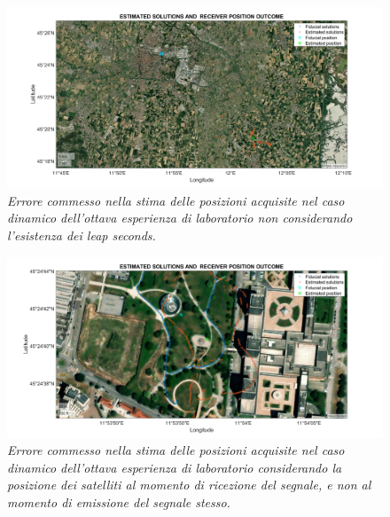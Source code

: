 \documentclass[a4paper,11pt,twoside]{book}
\begin{document}
	\begin{figure}[H]
		\centering
		\includegraphics[scale=0.30]{"Immagini workbook/Immagini esp8/err_leap_8"}
		\caption{\textit{Errore commesso nella stima delle posizioni acquisite nel caso dinamico dell'ottava esperienza di laboratorio non considerando l'esistenza dei leap seconds.}}
		\label{fig:errleap8}
	\end{figure}
	
	\vspace{-0.7cm}
	
	\begin{figure}[H]
		\centering
		\includegraphics[scale=0.30]{"Immagini workbook/Immagini esp8/err_satpos_8"}
		\caption{\textit{Errore commesso nella stima delle posizioni acquisite nel caso dinamico dell'ottava esperienza di laboratorio considerando la posizione dei satelliti al momento di ricezione del segnale, e non al momento di emissione del segnale stesso.}}
		\label{fig:errsatpos8}
	\end{figure}
	
	\vspace{-1cm}
	
\end{document}
